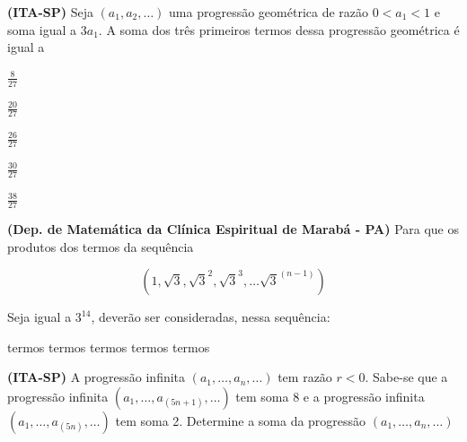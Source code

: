 \begin{questions}
  \question \textbf{(ITA-SP)} Seja $(a_{1}, a_{2}, \dots)$ uma progressão geométrica de razão $0 < a_{1} < 1$ e soma igual a $3a_{1}$. A soma dos três primeiros termos dessa progressão geométrica é igual a

  \vspace{0.3cm}

  \begin{oneparchoices}
    \choice $\displaystyle \frac{8}{27}$

    \choice $\displaystyle \frac{20}{27}$

    \choice $\displaystyle \frac{26}{27}$

    \choice $\displaystyle \frac{30}{27}$

    \choice $\displaystyle \frac{38}{27}$
  \end{oneparchoices}

  \vspace{0.5cm}

  \question \textbf{(Dep. de Matemática da Clínica Espiritual de Marabá - PA)} Para que os produtos dos termos da sequência

  \[\left(1, \sqrt{3}, \sqrt{3}^{2}, \sqrt{3}^{3}, \dots \sqrt{3}^{(n - 1)}\right)\]

  Seja igual a $3^{14}$, deverão ser consideradas, nessa sequência:

  \vspace{0.3cm}

  \begin{oneparchoices}
     termos
     termos
     termos
     termos
     termos
  \end{oneparchoices}

  \vspace{0.5cm}

  \question \textbf{(ITA-SP)} A progressão infinita $(a_{1}, \dots, a_{n}, \dots)$ tem razão $r < 0$. Sabe-se que a progressão infinita $(a_{1}, \dots, a_{(5n + 1)}, \dots)$ tem soma 8 e a progressão infinita $(a_{1}, \dots, a_{(5n)}, \dots)$ tem soma 2. Determine a soma da progressão $(a_{1}, \dots, a_{n}, \dots)$

\end{questions}
